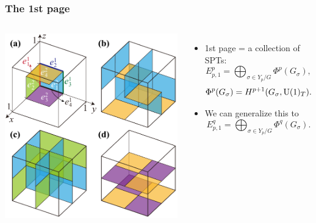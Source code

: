 \documentclass[xcolor=table, aspectratio=169,ignorenonframetext]{beamer}
\newcommand{\uone}{\text U(1)}
\begin{document}
\begin{frame}
	\frametitle{The 1st page}

	\begin{columns}
		\begin{center}
			\includegraphics[width=\textwidth]{../spspt/blocks}
		\end{center}
		\begin{itemize}
			\item 1st page = a collection of SPTs:
			\[E^p_{p,1} = \bigoplus_{\sigma\in Y_p/G} \Phi^p(G_\sigma),\]
			\[\Phi^p(G_\sigma) = H^{p+1}(G_\sigma, \uone_T).\]
			\item We can generalize this to
			\[E^q_{p,1} = \bigoplus_{\sigma\in Y_p/G} \Phi^q(G_\sigma).\]
		\end{itemize}
	\end{columns}
\end{frame}
\end{document}
